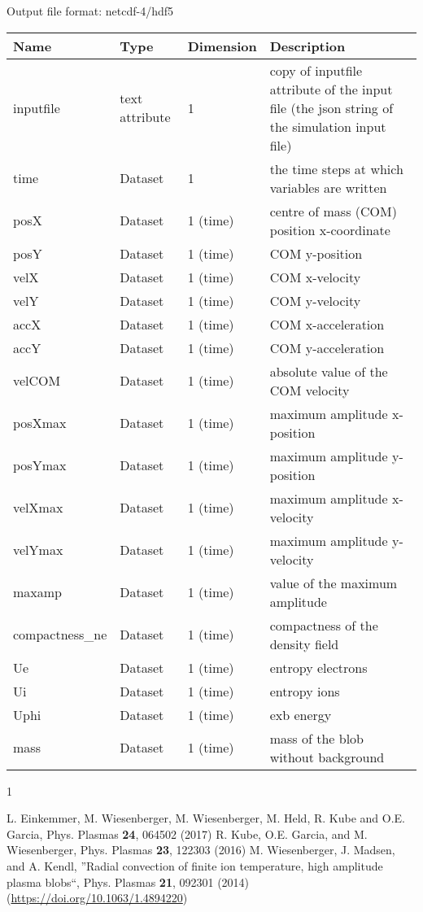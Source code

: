 \documentclass{hitec}
\renewenvironment{thebibliography}[1]{
  \begin{oldthebibliography}{#1}
    \RaggedRight %
    \setlength{\itemsep}{0em}
    \setlength{\parskip}{0em}
}
{
  \end{oldthebibliography}
}
\begin{document}
Output file format: netcdf-4/hdf5
%
\begin{longtable}{lll>{\RaggedRight}p{7cm}}
\toprule
\rowcolor{gray!50}\textbf{Name} &  \textbf{Type} & \textbf{Dimension} & \textbf{Description}  \\ \midrule
 inputfile & text attribute & 1 & copy of inputfile attribute of the input file (the json string of the simulation input file) \\
 time & Dataset & 1 & the time steps at which variables are written \\
 posX & Dataset & 1 (time) & centre of mass (COM) position x-coordinate \\
 posY & Dataset & 1 (time) &COM y-position \\
 velX & Dataset & 1 (time)& COM x-velocity \\
 velY & Dataset & 1 (time)& COM y-velocity \\
 accX & Dataset & 1 (time)& COM x-acceleration \\
 accY & Dataset & 1 (time)& COM y-acceleration \\
 velCOM & Dataset & 1 (time)&absolute value of the COM velocity \\
 posXmax& Dataset & 1 (time)&maximum amplitude x-position \\
 posYmax& Dataset & 1 (time)&maximum amplitude y-position \\
 velXmax& Dataset & 1 (time)&maximum amplitude x-velocity \\
 velYmax& Dataset & 1 (time)&maximum amplitude y-velocity \\
 maxamp & Dataset & 1 (time)&value of the maximum amplitude  \\
  compactness\_ne& Dataset & 1 (time) &compactness of the density field \\
 Ue& Dataset&  1 (time) &entropy electrons \\
 Ui &Dataset& 1 (time) & entropy ions \\
 Uphi& Dataset& 1 (time) &  exb energy \\
 mass& Dataset & 1 (time) & mass of the blob without background \\
\bottomrule
\end{longtable}
\begin{thebibliography}{1}
    L. Einkemmer, M. Wiesenberger, 
    M. Wiesenberger, M. Held, R. Kube and O.E. Garcia, Phys. Plasmas {\bf 24}, 064502 (2017)
    R. Kube, O.E. Garcia, and M. Wiesenberger, Phys. Plasmas {\bf 23}, 122303 (2016)
    M. Wiesenberger, J. Madsen, and A. Kendl, ''Radial convection of finite ion tem\-per\-a\-ture, high amplitude plasma blobs``, Phys. Plasmas {\bf 21}, 092301 (2014) (\mbox{\url{https://doi.org/10.1063/1.4894220}})
\end{thebibliography}
\end{document}
